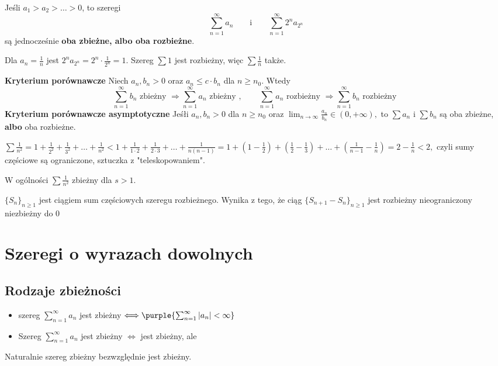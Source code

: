 Jeśli $a_1 > a_2 > \dots > 0$, to szeregi
$$
\sum_{n=1}^{\infty}a_n \qquad \mbox{i} \qquad \sum_{n=1}^{\infty}2^na_{2^n}
$$
są jednocześnie \textbf{oba zbieżne, albo oba rozbieżne}.
\begin{example}
    Dla $a_n=\frac{1}{n}$ jest $2^na_{2^n}=2^n\cdot\frac{1}{2^n}=1$. Szereg $\sum 1$ jest rozbieżny, więc $\sum\frac{1}{n}$ także.
\end{example}
\textbf{Kryterium porównawcze}
Niech $a_n, b_n>0$ oraz $a_n\le c \cdot b_n$ dla $n\ge n_0$. Wtedy
$$
\sum_{n=1}^{\infty}b_n \mbox{ zbieżny } \Longrightarrow \sum_{n=1}^{\infty}a_n \mbox{ zbieżny }, \qquad 
\sum_{n=1}^{\infty}a_n \mbox{ rozbieżny } \Longrightarrow \sum_{n=1}^{\infty}b_n \mbox{ rozbieżny }
$$
\textbf{Kryterium porównawcze asymptotyczne}
Jeśłi $a_n, b_n>0$ dla $n\ge n_0$ oraz $\lim_{n\to\infty}\frac{a_n}{b_n}\in(0, +\infty),$ to $\sum a_n$ i $\sum b_n$ są oba zbieżne, \textbf{albo} oba rozbieżne.
\begin{example}
    $\sum\frac{1}{n^2}=1 + \frac{1}{2^2} + \frac{1}{3^2}+\dots+\frac{1}{n^2} < 1 + \frac{1}{1\cdot 2} + \frac{1}{2\cdot 3} + \dots + \frac{1}{n(n-1)}=1+(1-\frac{1}{2})+(\frac{1}{2}-\frac{1}{3})+\dots+(\frac{1}{n-1}-\frac{1}{n}) = 2-\frac{1}{n} < 2,$ czyli sumy częściowe są ograniczone, sztuczka z "teleskopowaniem".

    W ogólności $\sum\frac{1}{n^2}$ zbieżny dla $s>1$.
\end{example}
\begin{problems}
    \prob $\{S_n\}_{n\geq1}$ jest ciągiem sum częściowych szeregu rozbieżnego. Wynika z tego, że ciąg $\{S_{n+1} - S_n\}_{n\geq1}$ jest
    \answers
    {rozbieżny}
    {nieograniczony}
    {niezbieżny do 0}
\end{problems}

\section{Szeregi o wyrazach dowolnych}
\subsection{Rodzaje zbieżności}
\begin{itemize}
    \item szereg $\sum_{n=1}^{\infty}a_n$ jest  zbieżny $\Longleftrightarrow \purple{\sum_{n=1}^{\infty}|a_n|<\infty}$
\item Szereg $\sum_{n=1}^{\infty}a_n$ jest  zbieżny $\Longleftrightarrow $ jest zbieżny, ale 
\end{itemize}
Naturalnie szereg zbieżny bezwzględnie jest zbieżny.
